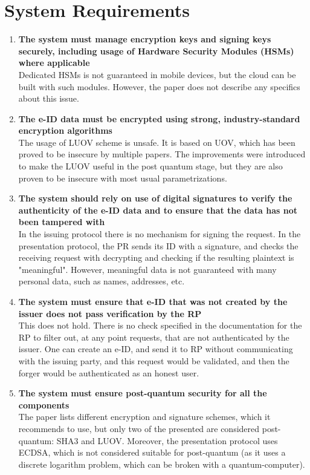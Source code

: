 \documentclass{article}
\begin{document}
	\homeworktitle
	\section{System Requirements}
	\begin{enumerate}
		\item\textbf{The system must manage encryption keys and signing keys securely, including usage of Hardware Security Modules (HSMs) where applicable}\\
		Dedicated HSMs is not guaranteed in mobile devices, but the cloud can be built with such modules. However, the paper does not describe any specifics about this issue.
		
		\item\textbf{The e-ID data must be encrypted using strong, industry-standard encryption algorithms}\\
		The usage of LUOV scheme is unsafe. It is based on UOV, which has been proved to be insecure by multiple papers. \cite{cryptoeprint:2004/222} \cite{cryptoeprint:2009/483} The improvements were introduced to make the LUOV useful in the post quantum stage, but they are also proven to be insecure with most usual parametrizations. \cite{ding2019new}
		
		\item\textbf{The system should rely on use of digital signatures to verify the authenticity of the e-ID data and to ensure that the data has not been tampered with}\\
		In the issuing protocol there is no mechanism for signing the request. In the presentation protocol, the PR sends its ID with a signature, and checks the receiving request with decrypting and checking if the resulting plaintext is "meaningful". However, meaningful data is not guaranteed with many personal data, such as names, addresses, etc.
		
		\item\textbf{The system must ensure that e-ID that was not created by the issuer does not pass verification by the RP}\\
		This does not hold. There is no check specified in the documentation for the RP to filter out, at any point requests, that are not authenticated by the issuer. One can create an e-ID, and send it to RP without communicating with the issuing party, and this request would be validated, and then the forger would be authenticated as an honest user.
		
		\item\textbf{The system must ensure post-quantum security for all the components }\\
		The paper lists different encryption and signature schemes, which it recommends to use, but only two of the presented are considered post-quantum: SHA3 and LUOV. Moreover, the presentation protocol uses ECDSA, which is not considered suitable for post-quantum (as it uses a discrete logarithm problem, which can be broken with a quantum-computer).
		

\end{enumerate}
\end{document}
